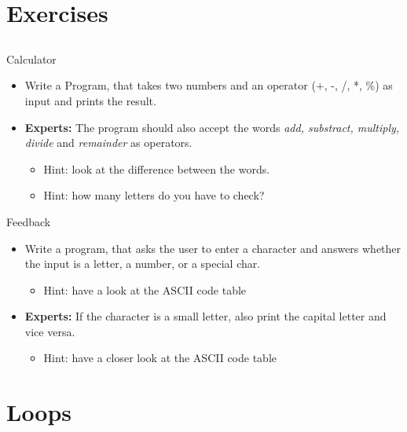\section{Exercises}
\subsection{}
\begin{frame}{Calculator}
	\begin{itemize}
		\item Write a Program, that takes two numbers and an operator (+, -, /, *, \%) as input and prints the result.
		\item \textbf{Experts:} The program should also accept the words \textit{add, substract, multiply, divide} and \textit{remainder} as operators.
		\begin{itemize}
			\item<2-> Hint: look at the difference between the words.
			\item<3-> Hint: how many letters do you have to check?
		\end{itemize}
	\end{itemize}
\end{frame}
\begin{frame}{Feedback}
	\begin{itemize}
		\item Write a program, that asks the user to enter a character and answers whether the input is a letter, a number, or a special char.
		\begin{itemize}
			\item<2-> Hint: have a look at the ASCII code table
		\end{itemize}
		\item \textbf{Experts:} If the character is a small letter, also print the capital letter and vice versa.
		\begin{itemize}
			\item<3-> Hint: have a closer look at the ASCII code table
		\end{itemize}
	\end{itemize}
\end{frame}
\section{Loops}
